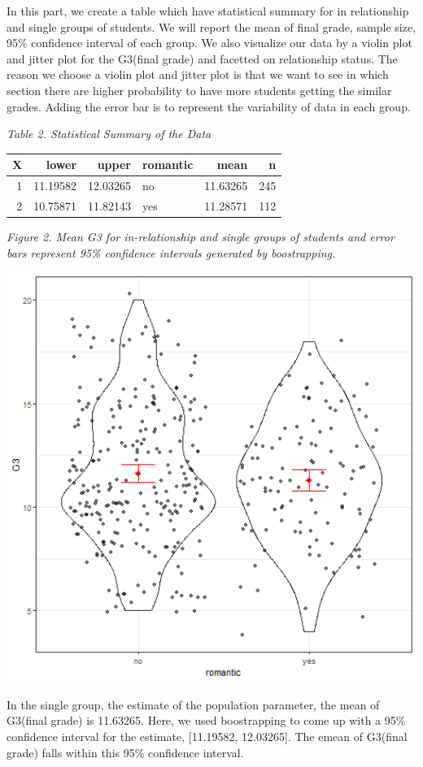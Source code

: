 \documentclass[]{article}
\begin{document}
In this part, we create a table which have statistical summary for in
relationship and single groups of students. We will report the mean of
final grade, sample size, 95\% confidence interval of each group. We
also visualize our data by a violin plot and jitter plot for the
G3(final grade) and facetted on relationship status. The reason we
choose a violin plot and jitter plot is that we want to see in which
section there are higher probability to have more students getting the
similar grades. Adding the error bar is to represent the variability of
data in each group.

\emph{Table 2. Statistical Summary of the Data}

\begin{longtable}[]{@{}rrrlrr@{}}
\toprule
X & lower & upper & romantic & mean & n\tabularnewline
\midrule
\endhead
1 & 11.19582 & 12.03265 & no & 11.63265 & 245\tabularnewline
2 & 10.75871 & 11.82143 & yes & 11.28571 & 112\tabularnewline
\bottomrule
\end{longtable}

\emph{Figure 2. Mean G3 for in-relationship and single groups of
students and error bars represent 95\% confidence intervals generated by
boostrapping.}

\includegraphics[width=6.67in]{../results/CI_plot}

In the single group, the estimate of the population parameter, the mean
of G3(final grade) is 11.63265. Here, we used boostrapping to come up
with a 95\% confidence interval for the estimate, {[}11.19582,
12.03265{]}. The emean of G3(final grade) falls within this 95\%
confidence interval.
\end{document}
